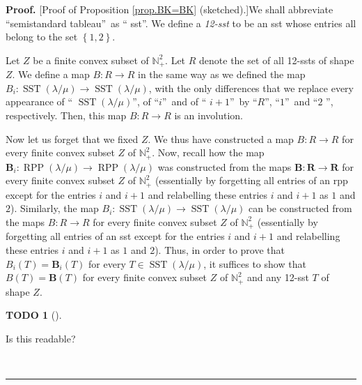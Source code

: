 \documentclass[numbers=enddot,12pt,final,onecolumn,notitlepage]{scrartcl}%
\theoremstyle{definition}
\newtheorem{quest}[theo]{TODO}
\newenvironment{todo}[1][]
{\begin{quest}[#1]\begin{leftbar}}
{\end{leftbar}\end{quest}}
\newenvironment{proof}[1][Proof]{\noindent\textbf{#1.} }{\ \rule{0.5em}{0.5em}}
\begin{document}
\begin{proof}
[Proof of Proposition \ref{prop.BK=BK} (sketched).]We shall abbreviate
\textquotedblleft semistandard tableau\textquotedblright\ as \textquotedblleft
sst\textquotedblright. We define a \textit{12-sst} to be an sst whose entries
all belong to the set $\left\{  1,2\right\}  $.

Let $Z$ be a finite convex subset of $\mathbb{N}_{+}^{2}$. Let $R$ denote the
set of all 12-ssts of shape $Z$. We define a map $B:R\rightarrow R$ in the
same way as we defined the map $B_{i}:\operatorname*{SST}\left(  \lambda
/\mu\right)  \rightarrow\operatorname*{SST}\left(  \lambda/\mu\right)  $, with
the only differences that we replace every appearance of \textquotedblleft%
$\operatorname*{SST}\left(  \lambda/\mu\right)  $\textquotedblright, of
\textquotedblleft$i$\textquotedblright\ and of \textquotedblleft%
$i+1$\textquotedblright\ by \textquotedblleft$R$\textquotedblright,
\textquotedblleft$1$\textquotedblright\ and \textquotedblleft$2$%
\textquotedblright, respectively. Then, this map $B:R\rightarrow R$ is an involution.

Now let us forget that we fixed $Z$. We thus have constructed a map
$B:R\rightarrow R$ for every finite convex subset $Z$ of $\mathbb{N}_{+}^{2}$.
Now, recall how the map $\mathbf{B}_{i}:\operatorname*{RPP}\left(  \lambda
/\mu\right)  \rightarrow\operatorname*{RPP}\left(  \lambda/\mu\right)  $ was
constructed from the maps $\mathbf{B}:\mathbf{R}\rightarrow\mathbf{R}$ for
every finite convex subset $Z$ of $\mathbb{N}_{+}^{2}$ (essentially by
forgetting all entries of an rpp except for the entries $i$ and $i+1$ and
relabelling these entries $i$ and $i+1$ as $1$ and $2$). Similarly, the map
$B_{i}:\operatorname*{SST}\left(  \lambda/\mu\right)  \rightarrow
\operatorname*{SST}\left(  \lambda/\mu\right)  $ can be constructed from the
maps $B:R\rightarrow R$ for every finite convex subset $Z$ of $\mathbb{N}%
_{+}^{2}$ (essentially by forgetting all entries of an sst except for the
entries $i$ and $i+1$ and relabelling these entries $i$ and $i+1$ as $1$ and
$2$). Thus, in order to prove that $B_{i}\left(  T\right)  =\mathbf{B}%
_{i}\left(  T\right)  $ for every $T\in\operatorname*{SST}\left(  \lambda
/\mu\right)  $, it suffices to show that $B\left(  T\right)  =\mathbf{B}%
\left(  T\right)  $ for every finite convex subset $Z$ of $\mathbb{N}_{+}^{2}$
and any 12-sst $T$ of shape $Z$.

\begin{todo}
Is this readable?
\end{todo}


\end{proof}
\end{document}
